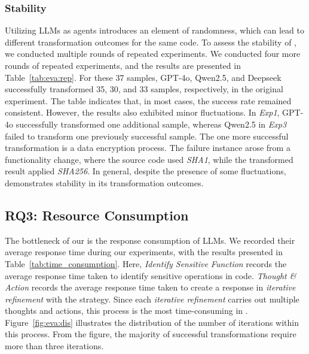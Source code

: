 \subsubsection{Stability}
Utilizing LLMs as agents introduces an element of randomness, which can lead to different transformation outcomes for the same code.
To assess the stability of \system, we conducted multiple rounds of repeated experiments.
We conducted four more rounds of repeated experiments, and the results are presented in Table~\ref{tab:eva:rep}.
For these 37 samples, GPT-4o, Qwen2.5, and Deepseek successfully transformed 35, 30, and 33 samples, respectively, in the original experiment.
The table indicates that, in most cases, the success rate remained consistent.
However, the results also exhibited minor fluctuations.
In \textit{Exp1}, GPT-4o successfully transformed one additional sample, whereas Qwen2.5 in \textit{Exp3} failed to transform one previously successful sample.
The one more successful transformation is a data encryption process.
The failure instance arose from a functionality change, where the source code used \emph{SHA1}, while the transformed result applied \emph{SHA256}.
In general, despite the presence of some fluctuations, \system demonstrates stability in its transformation outcomes.



\subsection{RQ3: Resource Consumption}
The bottleneck of our \system is the response consumption of LLMs.
We recorded their average response time during our experiments, with the results presented in Table~\ref{tab:time_consumption}.
Here, \textit{Identify Sensitive Function} records the average response time taken to identify sensitive operations in code.
\textit{Thought \& Action} records the average response time taken to create a response in \emph{iterative refinement} with the  strategy.
Since each \emph{iterative refinement} carries out multiple thoughts and actions, this process is the most time-consuming in \system.
Figure~\ref{fig:eva:dis} illustrates the distribution of the number of iterations within this process.
From the figure, the majority of successful transformations require more than three iterations.



